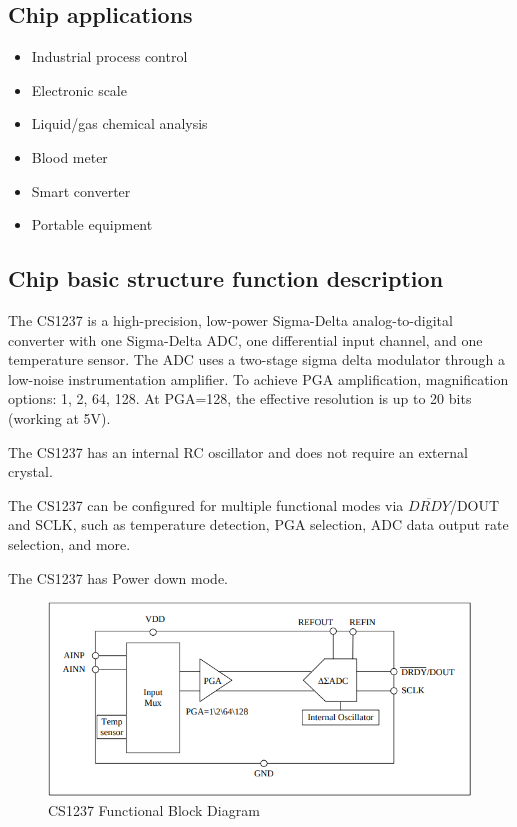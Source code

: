 \documentclass{article}
\begin{document}
\subsection{Chip applications}

\begin{itemize}
    \item Industrial process control
    \item Electronic scale
    \item Liquid/gas chemical analysis
    \item Blood meter
    \item Smart converter
    \item Portable equipment
\end{itemize}

\subsection{Chip basic structure function description}

The CS1237 is a high-precision, low-power Sigma-Delta analog-to-digital converter with one Sigma-Delta ADC, one differential input channel, and one temperature sensor. The ADC uses a two-stage sigma delta modulator through a low-noise instrumentation amplifier. To achieve PGA amplification, magnification options: 1, 2, 64, 128. At PGA=128, the effective resolution is up to 20 bits (working at 5V).

The CS1237 has an internal RC oscillator and does not require an external crystal.

The CS1237 can be configured for multiple functional modes via $\overline{DRDY}$/DOUT and SCLK, such as temperature detection, PGA selection, ADC data output rate selection, and more.

The CS1237 has Power down mode.

\begin{figure}[h]
    \centering
    \includegraphics[width=1\textwidth]{fig1.png}
    \caption{CS1237 Functional Block Diagram}
    \label{fig:fig1}
\end{figure}
\end{document}
